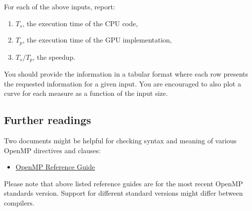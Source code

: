 \documentclass[a4paper, 11pt]{article}
\begin{document}
        \noindent For each of the above inputs, report:

        \begin{enumerate}
                \item $T_s$, the execution time of the CPU code,
                \item $T_p$, the execution time of the GPU implementation,
                \item $T_s/T_p$, the speedup.
        \end{enumerate}

You should provide the information in a tabular format where each row presents the requested information for a given input. You are encouraged to also plot a curve for each measure as a function of the input size.


\subsection{Further readings}

Two documents might be helpful for checking syntax and meaning of various OpenMP directives and clauses:
\begin{itemize}
\item \href{https://www.openmp.org/wp-content/uploads/OpenMPRefGuide-5.2-Web-2024.pdf}{OpenMP Reference Guide}
\end{itemize}
Please note that above listed reference guides are for the most recent OpenMP standards version. Support for different standard versions might differ between compilers.
\end{document}
